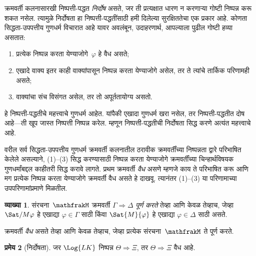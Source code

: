 \documentclass[11pt,a4paper,openany]{book}
\theoremstyle{definition}
\newtheorem{defn}{व्याख्या}[section]
\newtheorem{thm}[defn]{प्रमेय}
\newenvironment{explain}{}{}
\newcommand{\applytofirst}[2]{{\expandafter#1#2}}
\newcommand{\Struct}[1]{\applytofirst{\mathfrak}{#1}}
\newcommand{\Sequent}{\Rightarrow}
\begin{document}
\begin{explain}
क्रमवर्ती कलनासारखी निष्पत्ती-पद्धत \emph{निर्दोष} असते, जर ती
प्रत्यक्षात धारण न करणाऱ्या गोष्टी निष्पन्न करू शकत नसेल. त्यामुळे
निर्दोषता हा निष्पत्ती-पद्धतींसाठी हमी दिलेल्या सुरक्षिततेचा एक प्रकार
आहे. कोणता सिद्धता-उपपत्तीय गुणधर्म विचारात आहे यावर अवलंबून, उदाहरणार्थ,
आपल्याला पुढील गोष्टी हव्या असतात:
\begin{enumerate}
\item प्रत्येक निष्पन्न करता येण्याजोगे~$\varphi$ हे वैध असते;
\item एखादे वाक्य इतर काही वाक्यांपासून निष्पन्न करता येण्याजोगे असेल, तर ते
  त्यांचे तार्किक परिणामही असते;
\item वाक्यांचा संच विसंगत असेल, तर तो अपूर्ततायोग्य असतो.
\end{enumerate}
हे निष्पत्ती-पद्धतीचे महत्त्वाचे गुणधर्म आहेत. यांपैकी एखादा गुणधर्म
खरा नसेल, तर निष्पत्ती-पद्धतीत दोष आहे—ती खूप जास्त निष्पत्ती
निष्पन्न करेल. म्हणून निष्पत्ती-पद्धतीची निर्दोषता सिद्ध करणे अत्यंत
महत्त्वाचे आहे.

वरील सर्व सिद्धता-उपपत्तीय गुणधर्म क्रमवर्ती कलनातील ठरावीक क्रमवर्तींच्या
निष्पन्नता द्वारे परिभाषित केलेले असल्याने, (1)--(3) सिद्ध करण्यासाठी
निष्पन्न करता येण्याजोगे क्रमवर्तींच्या चिन्हार्थविषयक गुणधर्मांबद्दल काहीतरी सिद्ध करावे
लागते. प्रथम क्रमवर्ती \emph{वैध} असणे म्हणजे काय ते परिभाषित करू आणि मग
प्रत्येक निष्पन्न करता येण्याजोगे क्रमवर्ती वैध असते हे दाखवू. त्यानंतर (1)--(3) या
परिणामाच्या उपपरिणामांप्रमाणे मिळतील.
\end{explain}

\begin{defn}
संरचना~$\Struct
  M$ क्रमवर्ती
$\Gamma \Sequent \Delta$ \emph{पूर्ण करते} तेव्हा आणि केवळ तेव्हाच, जेव्हा
$\Sat/{M}{\varphi}$ हे एखाद्या $\varphi \in \Gamma$ साठी किंवा
$\Sat{M}{\varphi}$ हे एखाद्या $\varphi \in \Delta$ साठी असते.

क्रमवर्ती \emph{वैध} असते तेव्हा आणि केवळ तेव्हाच, जेव्हा प्रत्येक
संरचना~$\Struct
  M$ ते पूर्ण करते.
\end{defn}

\begin{thm}[निर्दोषता]
\label{fol:seq:sou:thm:sequent-soundness} जर $\Log{LK}$ निष्पन्न $\Theta
\Sequent \Xi$, तर $\Theta \Sequent \Xi$ वैध आहे.
\end{thm}
\end{document}
